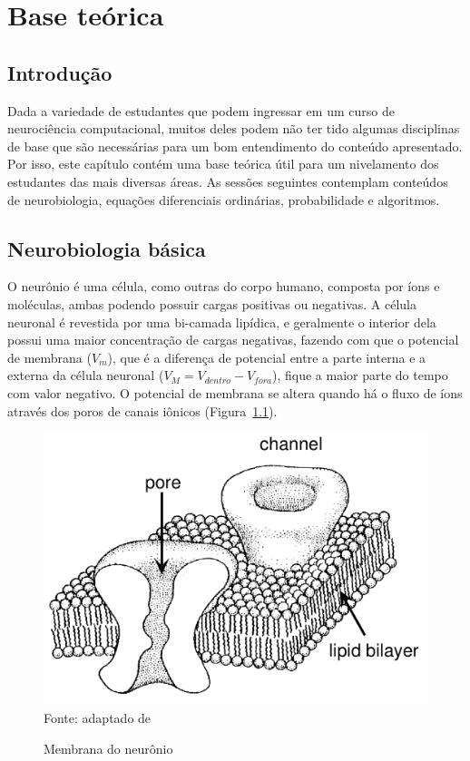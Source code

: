 \chapter{Base teórica}\label{cap:teoria}
\section{Introdução}\label{sec:teoria_intro}
Dada a variedade de estudantes que podem ingressar em um curso de neurociência computacional, muitos deles podem não ter tido algumas disciplinas de base que são necessárias para um bom entendimento do conteúdo apresentado. Por isso, este capítulo contém uma base teórica útil para um nivelamento dos estudantes das mais diversas áreas. As sessões seguintes contemplam conteúdos de neurobiologia, equações diferenciais ordinárias, probabilidade e algoritmos.

\section{Neurobiologia básica}\label{sec:fisiologia}
O neurônio é uma célula, como outras do corpo humano, composta por íons e moléculas, ambas podendo possuir cargas positivas ou negativas. A célula neuronal é revestida por uma bi-camada lipídica, e geralmente o interior dela possui uma maior concentração de cargas negativas, fazendo com que o potencial de membrana ($V_m$), que é a diferença de potencial entre a parte interna e a externa da célula neuronal ($V_M=V_{dentro}-V_{fora}$), fique a maior parte do tempo com valor negativo. O potencial de membrana se altera quando há o fluxo de íons através dos poros de canais iônicos (Figura~\ref{fig:membrananeuronio}).

\begin{figure}[tb]
	\centering
	\caption[Membrana do neurônio]{Membrana do neurônio}
	\includegraphics[width=0.55\linewidth]{figs/membrana_neuronio}
	\label{fig:membrananeuronio}
	\\
	Fonte: adaptado de \cite{hille_ionic_1992}
\end{figure}

